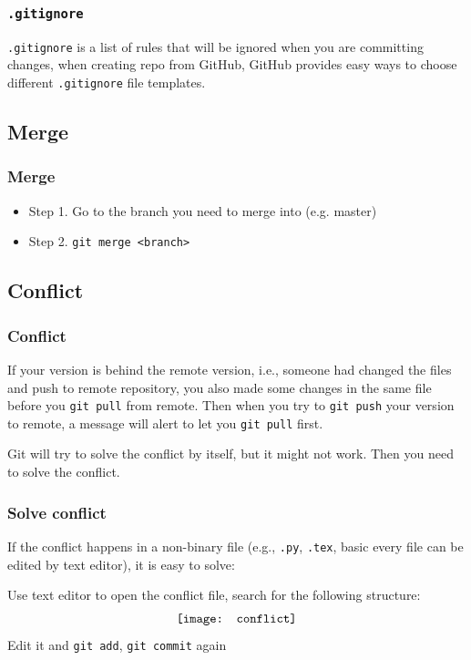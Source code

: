 \documentclass{beamer}
\begin{document}
			\begin{frame}
				\frametitle{\texttt{.gitignore}}
				\texttt{.gitignore} is a list of rules that will be ignored when you are committing changes, when creating repo from GitHub, GitHub provides easy ways to choose different \texttt{.gitignore} file templates.
			\end{frame}

		\subsection{Merge}
			\begin{frame}
				\frametitle{Merge}
				\begin{itemize}
					\item Step 1. Go to the branch you need to merge into (e.g. master)
					\item Step 2. \texttt{git merge <branch>}
				\end{itemize}
			\end{frame}

		\subsection{Conflict}
			\begin{frame}
				\frametitle{Conflict}
				If your version is behind the remote version, i.e., someone had changed the files and push to remote repository, you also made some changes in the same file before you \texttt{git pull} from remote. Then when you try to \texttt{git push} your version to remote, a message will alert to let you \texttt{git pull} first.

				Git will try to solve the conflict by itself, but it might not work. Then you need to solve the conflict.
			\end{frame}

			\begin{frame}
				\frametitle{Solve conflict}
				If the conflict happens in a non-binary file (e.g., \texttt{.py}, \texttt{.tex}, basic every file can be edited by text editor), it is easy to solve:

				Use text editor to open the conflict file, search for the following structure:
				\begin{align}
					\centering
					\texttt{[image: conflict]} \nonumber
				\end{align}
				Edit it and \texttt{git add}, \texttt{git commit} again
			\end{frame}
\end{document}
